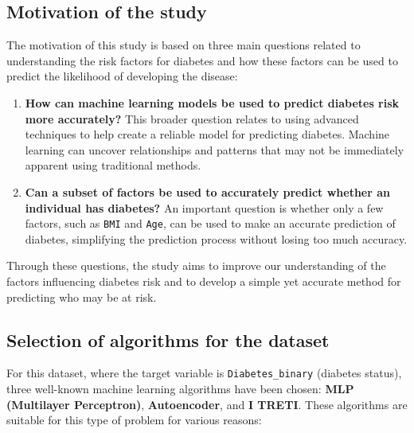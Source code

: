 \subsection{Motivation of the study}

The motivation of this study is based on three main questions related to understanding the risk factors for diabetes and how these factors can be used to predict the likelihood of developing the disease:

\begin{enumerate}    
    \item \textbf{How can machine learning models be used to predict diabetes risk more accurately?} This broader question relates to using advanced techniques to help create a reliable model for predicting diabetes. Machine learning can uncover relationships and patterns that may not be immediately apparent using traditional methods.

    \item \textbf{Can a subset of factors be used to accurately predict whether an individual has diabetes?} An important question is whether only a few factors, such as \texttt{BMI} and \texttt{Age}, can be used to make an accurate prediction of diabetes, simplifying the prediction process without losing too much accuracy. 
\end{enumerate}

Through these questions, the study aims to improve our understanding of the factors influencing diabetes risk and to develop a simple yet accurate method for predicting who may be at risk.


\subsection{Selection of algorithms for the dataset}

For this dataset, where the target variable is \texttt{Diabetes\_binary} (diabetes status), three well-known machine learning algorithms have been chosen: \textbf{MLP (Multilayer Perceptron)}, \textbf{Autoencoder}, and \textbf{I TRETI}. These algorithms are suitable for this type of problem for various reasons:

